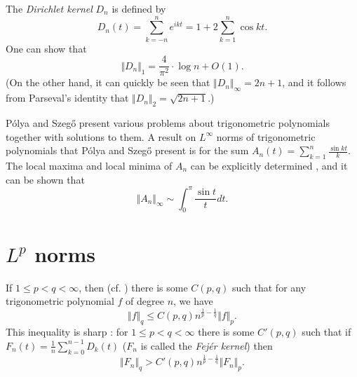 \documentclass{article}
\newcommand{\norm}[1]{\Vert #1 \Vert}
\theoremstyle{definition}
\begin{document}
The {\em Dirichlet kernel} $D_n$ is defined by
\[
D_n(t)=\sum_{k=-n}^n e^{ikt}=1+2\sum_{k=1}^n \cos kt.
\]
One can show \cite[p.~71, Exercise 1.1]{katznelson} that
\[
\norm{D_n}_1 = \frac{4}{\pi^2}\cdot \log n+O(1).
\]
(On the other hand, it can quickly be seen that $\norm{D_n}_\infty=2n+1$, and it follows from Parseval's identity that
$\norm{D_n}_2=\sqrt{2n+1}$.)

P\'olya and Szeg{\H o} \cite[Part VI]{polya} present various problems about trigonometric polynomials together  with solutions to them.
A result on $L^\infty$ norms of trigonometric polynomials that P\'olya and Szeg{\H o} present is for the sum $A_n(t)=\sum_{k=1}^n \frac{\sin kt}{k}$. The local maxima and local minima of $A_n$ can be
explicitly determined \cite[p.~74, no.~23]{polya}, and 
it can be shown that \cite[p.~74, no.~25]{polya}
\[
\norm{A_n}_\infty \sim
\int_0^\pi \frac{\sin t}{t} dt.
\]

\section{$L^p$ norms}
If $1 \leq p < q < \infty$, then  \cite[p.~123, Exercise~1.8]{katznelson} (cf. \cite[p.~102, Theorem 2.6]{devore}) there is some $C(p,q)$ such that for any trigonometric polynomial $f$ of degree $n$, we
have
\[
\norm{f}_q \leq C(p,q) n^{\frac{1}{p}-\frac{1}{q}} \norm{f}_p.
\]
This inequality is sharp  \cite[p.~230]{timan}: for $1 \leq p < q < \infty$ there is some $C'(p,q)$ such that
if $F_n(t)=\frac{1}{n}\sum_{k=0}^{n-1}D_k(t)$ ($F_n$ is called the {\em Fej\'er kernel})  then
\[
\norm{F_n}_q > C'(p,q) n^{\frac{1}{p}-\frac{1}{q}} \norm{F_n}_p.
\]
\end{document}
